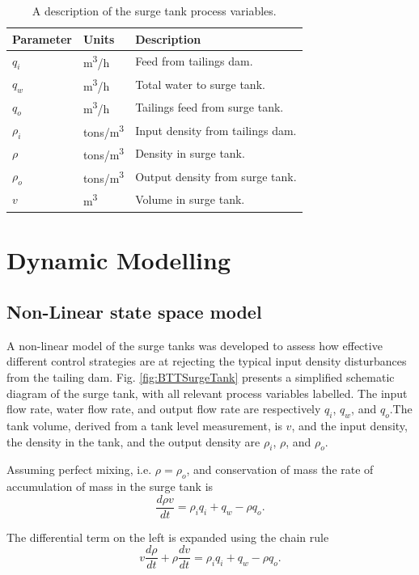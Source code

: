 \documentclass[preprint,authoryear,12pt]{elsarticle}
\begin{document}
\begin{table}[bp]
	\centering
	\caption{A description of the surge tank process variables.}
	\label{Table:ProcessVariables}
	\begin{tabular}{lll}
		\hline 
		Parameter 	&  Units & Description \tabularnewline
		\hline
		$q_{i}$ 	& m\textsuperscript{3}/h 	& 	Feed from tailings dam.\tabularnewline
		$q_{w}$ 	& m\textsuperscript{3}/h 	& 	Total water to surge tank.\tabularnewline
		$q_{o}$ 	& m\textsuperscript{3}/h 	& 	Tailings feed from surge tank.\tabularnewline
		$\rho_i$	& tons/m\textsuperscript{3}	&	Input density from tailings dam.\tabularnewline
		$\rho$		& tons/m\textsuperscript{3}	&	Density in surge tank.\tabularnewline
		$\rho_o$	& tons/m\textsuperscript{3}	&	Output density from surge tank.\tabularnewline
		$v$			& m\textsuperscript{3}		&	Volume in surge tank.\tabularnewline
		\hline
	\end{tabular}
\end{table}


\section{Dynamic Modelling}\label{Section:DynamicModelling}
\subsection{Non-Linear state space model}
A non-linear model of the surge tanks was developed to assess how effective different control strategies are at rejecting the typical input density disturbances from the tailing dam. Fig. \ref{fig:BTTSurgeTank} presents a simplified schematic diagram of the surge tank, with all relevant process variables labelled. The input flow rate, water flow rate, and output flow rate are respectively $q_i$, $q_w$, and $q_o$.The tank volume, derived from a tank level measurement, is $v$, and the input density, the density in the tank, and the output density are $\rho_i$, $\rho$, and $\rho_o$.

Assuming perfect mixing, i.e. $\rho = \rho_o$, and conservation of mass the rate of accumulation of mass in the surge tank is 
\begin{equation}
	\frac{d\rho v}{dt} = \rho_iq_i + q_w - \rho q_o .
\label{eq:MassBalance}
\end{equation}

The differential term on the left is expanded using the chain rule
\begin{equation}
v\frac{d\rho}{dt} + \rho\frac{dv}{dt}= \rho_iq_i + q_w - \rho q_o .
\label{eq:AxpandedMassBalance}
\end{equation}
\end{document}
